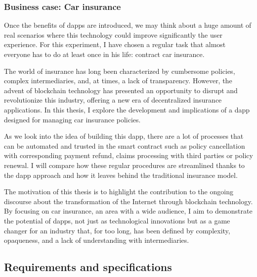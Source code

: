 \subsubsection{Business case: Car insurance}
{Once the benefits of dapps are introduced, we may think about a huge amount of real scenarios where this technology could improve significantly the user experience. For this experiment, I have chosen a regular task that almost everyone has to do at least once in his life: contract car insurance.

The world of insurance has long been characterized by cumbersome policies, complex intermediaries, and, at times, a lack of transparency. However, the advent of blockchain technology has presented an opportunity to disrupt and revolutionize this industry, offering a new era of decentralized insurance applications. In this thesis, I explore the development and implications of a dapp designed for managing car insurance policies.

As we look into the idea of building this dapp, there are a lot of processes that can be automated and trusted in the smart contract such as policy cancellation with corresponding payment refund, claims processing with third parties or policy renewal. I will compare how these regular procedures are streamlined thanks to the dapp approach and how it leaves behind the traditional insurance model.

The motivation of this thesis is to highlight the contribution to the ongoing discourse about the transformation of the Internet through blockchain technology. By focusing on car insurance, an area with a wide audience, I aim to demonstrate the potential of dapps, not just as technological innovations but as a game changer for an industry that, for too long, has been defined by complexity, opaqueness, and a lack of understanding with intermediaries.}

\subsection{Requirements and specifications}

